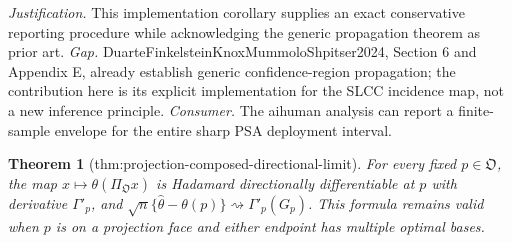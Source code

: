 \documentclass{article}
\newtheorem{theorem}{Theorem}
\begin{document}
\par\smallskip\noindent \textit{Justification.} This implementation corollary supplies an exact conservative reporting procedure while acknowledging the generic propagation theorem as prior art. \textit{Gap.} DuarteFinkelsteinKnoxMummoloShpitser2024, Section 6 and Appendix E, already establish generic confidence-region propagation; the contribution here is its explicit implementation for the SLCC incidence map, not a new inference principle. \textit{Consumer.} The aihuman analysis can report a finite-sample envelope for the entire sharp PSA deployment interval.

\begin{theorem}[thm:projection-composed-directional-limit]\label{thm:projection-composed-directional-limit}
For every fixed \(p\in\mathfrak O\), the map \(x\mapsto\theta(\Pi_{\mathfrak O}x)\) is Hadamard directionally differentiable at \(p\) with derivative \(\Gamma'_p\), and \(\sqrt n\{\widehat\theta-\theta(p)\}\rightsquigarrow\Gamma'_p(G_p)\). This formula remains valid when \(p\) is on a projection face and either endpoint has multiple optimal bases.
\end{theorem}
\end{document}
